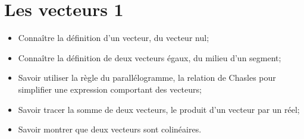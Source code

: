 \chapter{Les vecteurs 1}\label{ChLesVecteurs}

\begin{acquis}
\begin{itemize}
\item Connaître la définition d'un vecteur, du vecteur nul;
\item Connaître la définition de deux  vecteurs égaux, du milieu d'un segment;
\item Savoir utiliser la règle du parallélogramme, la relation de Chasles pour simplifier une expression comportant des vecteurs;
\item Savoir tracer la somme de deux vecteurs, le produit d'un vecteur par un réel;
\item Savoir montrer que deux vecteurs sont colinéaires.
\end{itemize}
\end{acquis}



\exercicesbase
\begin{colonne*exercice}

\end{colonne*exercice}

\connaissances
%

\pagebreak



